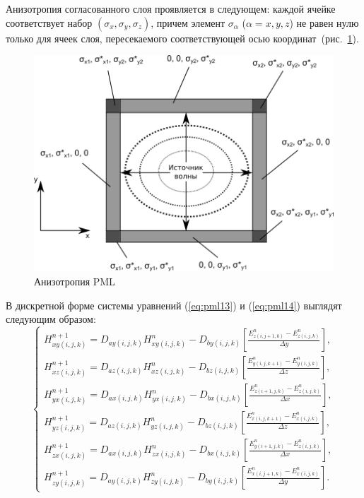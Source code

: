 Анизотропия согласованного слоя проявляется в следующем: каждой ячейке соответствует набор $(\sigma_x,\sigma_y,\sigma_z)$, причем элемент $\sigma_\alpha$ ($\alpha={x,y,z}$) не равен нулю только для ячеек слоя, пересекаемого соответствующей осью координат~(рис.~\ref{fig:PML}).

\afterpage{\clearpage}
\begin{figure}[p]
\centering
\includegraphics[width=1\textwidth]{include/graphics/image4195}
\caption{Анизотропия PML}
\label{fig:PML}
\end{figure}

В дискретной форме системы уравнений (\ref{eq:pml13}) и (\ref{eq:pml14}) выглядят следующим образом:
\begin{equation*}
\left\{
\begin{aligned}
H_{xy (i,j,k)}^{n+1} = D_{ay (i,j,k)} H_{xy (i,j,k)}^{n} - D_{by (i,j,k)}
\left[
    \frac{E_{z (i,j+1,k)}^n - E_{z (i,j,k)}^n}{\Delta y}
\right], \\
H_{xz (i,j,k)}^{n+1} = D_{az (i,j,k)} H_{xz (i,j,k)}^{n} - D_{bz (i,j,k)}
\left[
    \frac{E_{y (i,j,k+1)}^n - E_{y (i,j,k)}^n}{\Delta z}
\right], \\
H_{yx (i,j,k)}^{n+1} = D_{ax (i,j,k)} H_{yx (i,j,k)}^{n} - D_{bx (i,j,k)}
\left[
    \frac{E_{z (i+1,j,k)}^n - E_{z (i,j,k)}^n}{\Delta x}
\right], \\
H_{yz (i,j,k)}^{n+1} = D_{az (i,j,k)} H_{yz (i,j,k)}^{n} - D_{bz (i,j,k)}
\left[
    \frac{E_{x (i,j,k+1)}^n - E_{x (i,j,k)}^n}{\Delta z}
\right], \\
H_{zx (i,j,k)}^{n+1} = D_{ax (i,j,k)} H_{zx (i,j,k)}^{n} - D_{bx (i,j,k)}
\left[
    \frac{E_{y (i+1,j,k)}^n - E_{z (i,j,k)}^n}{\Delta x}
\right], \\
H_{zy (i,j,k)}^{n+1} = D_{ay (i,j,k)} H_{zy (i,j,k)}^{n} - D_{by (i,j,k)}
\left[
    \frac{E_{x (i,j+1,k)}^n - E_{x (i,j,k)}^n}{\Delta y}
\right].
\end{aligned}
\right.
\end{equation*}

